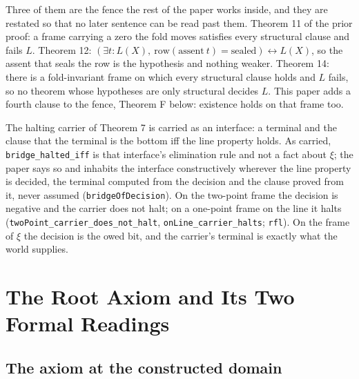 \documentclass[10pt,twocolumn]{article}
\begin{document}
Three of them are the fence the rest of the paper works inside, and they
are restated so that no later sentence can be read past them. Theorem 11
of the prior proof: a frame carrying a zero the fold moves satisfies
every structural clause and fails \(L\). Theorem 12:
\((\exists t : L(X),\ \mathrm{row}(\mathrm{assent}\ t) = \mathrm{sealed}) \leftrightarrow L(X)\),
so the assent that seals the row is the hypothesis and nothing weaker.
Theorem 14: there is a fold-invariant frame on which every structural
clause holds and \(L\) fails, so no theorem whose hypotheses are only
structural decides \(L\). This paper adds a fourth clause to the fence,
Theorem F below: existence holds on that frame too.

The halting carrier of Theorem 7 is carried as an interface: a terminal
and the clause that the terminal is the bottom iff the line property
holds. As carried, \texttt{bridge\_\allowbreak halted\_\allowbreak iff}
is that interface's elimination rule and not a fact about \(\xi\); the
paper says so and inhabits the interface constructively wherever the
line property is decided, the terminal computed from the decision and
the clause proved from it, never assumed (\texttt{bridgeOfDecision}). On
the two-point frame the decision is negative and the carrier does not
halt; on a one-point frame on the line it halts
(\texttt{twoPoint\_\allowbreak carrier\_\allowbreak does\_\allowbreak not\_\allowbreak halt},
\texttt{onLine\_\allowbreak carrier\_\allowbreak halts}; \texttt{rfl}).
On the frame of \(\xi\) the decision is the owed bit, and the carrier's
terminal is exactly what the world supplies.

\hypertarget{the-root-axiom-and-its-two-formal-readings}{%
\section{The Root Axiom and Its Two Formal
Readings}\label{the-root-axiom-and-its-two-formal-readings}}

\hypertarget{the-axiom-at-the-constructed-domain}{%
\subsection{The axiom at the constructed
domain}\label{the-axiom-at-the-constructed-domain}}
\end{document}
